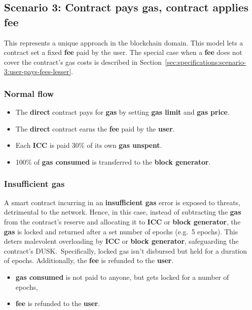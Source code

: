 \documentclass[twocolumn, nofootinbib]{revtex4-2} %
\newcommand{\dusk}{{\footnotesize\textsf{DUSK}}\xspace}
\newcommand{\emphathize}[1]{\textbf{#1}\xspace}
\newcommand{\blockgenerator}{\emphathize{block generator}}
\newcommand{\direct}{\emphathize{direct}}
\newcommand{\fee}{\emphathize{fee}}
\newcommand{\gas}{\emphathize{gas}}
\newcommand{\gasprice}{\emphathize{gas price}}
\newcommand{\gaslimit}{\emphathize{gas limit}}
\newcommand{\gasconsumed}{\emphathize{gas consumed}}
\newcommand{\gasunspent}{\emphathize{gas unspent}}
\newcommand{\insufficientgas}{\emphathize{insufficient gas}}
\newcommand{\icc}{\emphathize{ICC}}
\newcommand{\user}{\emphathize{user}}
\begin{document}
    \subsection{Scenario 3: Contract pays gas, contract applies fee}\label{sec:specifications:scenario-3}
    This represents a unique approach in the blockchain domain.
    This model lets a contract set a fixed \fee paid by the user.
    The special case when a \fee does not cover the contract's gas costs
    is described in Section~\ref{sec:specifications:scenario-3:user-pays-fees-lesser}.

    \subsubsection{Normal flow}\label{sec:specifications:scenario-3:normal-flow}
    \begin{itemize}
        \item The \direct contract pays for \gas by setting
              \gaslimit and \gasprice.
        \item The \direct contract earns the \fee paid by the \user.
        \item Each \icc is paid 30\% of its own \gasunspent.
        \item 100\% of \gasconsumed is transferred to the \blockgenerator.
    \end{itemize}

    \subsubsection{Insufficient gas}\label{sec:specifications:scenario-3:insufficient-gas}
    A smart contract incurring in an \insufficientgas error is exposed
    to threats, detrimental to the network.
    Hence, in this case, instead of subtracting the \gas from the
    contract's reserve and allocating it to \icc or
    \blockgenerator, the \gas is locked and returned after a
    set number of epochs (e.g.\ 5 epochs).
    This deters malevolent overloading by \icc or
    \blockgenerator, safeguarding the contract's \dusk.\
    Specifically, locked gas isn't disbursed but held for a duration of epochs.
    Additionally, the \fee is refunded to the \user.

    \begin{itemize}
        \item \gasconsumed is not paid to anyone, but gets locked for
              a number of epochs,
        \item \fee is refunded to the \user.
    \end{itemize}
\end{document}

